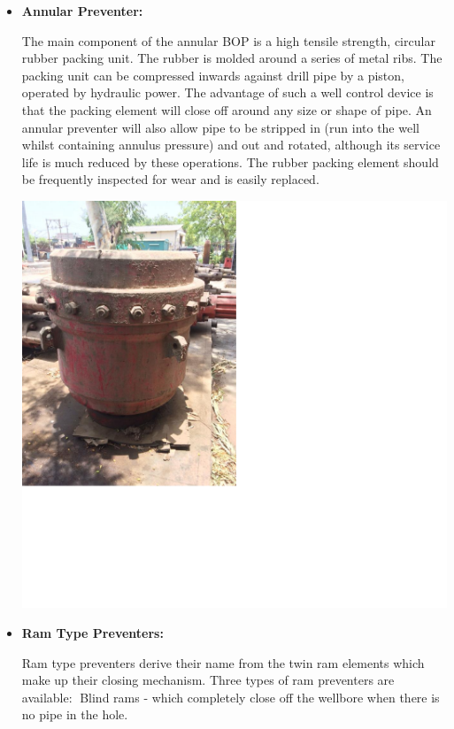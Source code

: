 \begin{itemize}
\item \textbf{Annular Preventer:}

 The main component of the
annular BOP is a high tensile strength, circular rubber
packing unit. The rubber is molded around a series of
metal ribs. The packing unit can be compressed
inwards against drill pipe by a piston, operated by
hydraulic power. The advantage of such a well
control device is that the packing element will close
off around any size or shape of pipe. An annular
preventer will also allow pipe to be stripped in (run
into the well whilst containing annulus pressure) and
out and rotated, although its service life is much
reduced by these operations. The rubber packing
element should be frequently inspected for wear and
is easily replaced.

\vspace{1em}

\includegraphics[scale=0.3]{images/annularbop}
\item \textbf{Ram Type Preventers:}

 Ram type preventers derive their name
from the twin ram elements which make up their closing
mechanism. Three types of ram preventers are available: Blind rams - which completely close off the wellbore when
there is no pipe in the hole.

\vspace{1em}
 \end{itemize}

